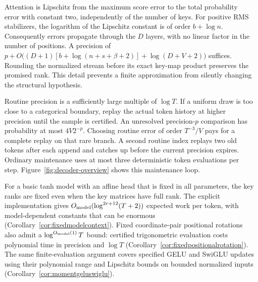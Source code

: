 Attention is Lipschitz from the maximum score error to the total
probability error with constant two, independently of the number
of keys. For positive RMS stabilizers, the logarithm of the Lipschitz
constant is of order $b+\log n$. Consequently errors propagate through
the $D$ layers, with no linear factor in the number of positions.
A precision of
$p+O\bigl((D+1)[b+\log(n+s+\beta+2)]+\log(D+V+2)\bigr)$
suffices.
Rounding the normalized stream before its exact key-map product
preserves the promised rank. This detail prevents a finite
approximation from silently changing the structural hypothesis.

Routine precision is a sufficiently large multiple of $\log T$.
If a uniform draw is too close to a categorical boundary, replay
the actual token history at higher precision until the sample is
certified. An unresolved precision-$p$ comparison has probability
at most $4V2^{-p}$. Choosing routine error of order $T^{-3}/V$
pays for a complete replay on that rare branch. A second routine
index replays two old tokens after each append and catches up
before the current precision expires. Ordinary maintenance uses
at most three deterministic token evaluations per step.
Figure~\ref{fig:decoder-overview} shows this maintenance loop.

For a basic tanh model with an affine head that is fixed in all
parameters, the key ranks are fixed even when the key matrices have
full rank. The explicit implementation gives
$O_{\rm model}(\log^{2r+12}(T+2))$ expected work per token, with
model-dependent constants that can be enormous
(Corollary~\ref{cor:fixedmodelcontext}).
Fixed coordinate-pair positional rotations also admit a
$\log^{O_{\rm model}(1)}T$ bound: certified trigonometric
evaluation costs polynomial time in precision and $\log T$
(Corollary~\ref{cor:fixedpositionalrotation}). The same
finite-evaluation argument covers specified GELU and SwiGLU updates
using their polynomial range and Lipschitz bounds on bounded
normalized inputs (Corollary~\ref{cor:momentgeluswiglu}).
